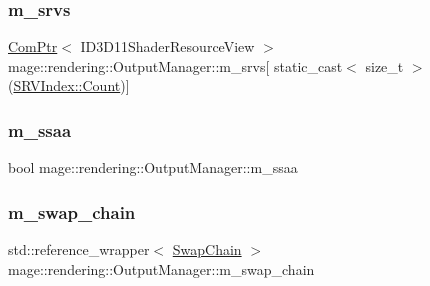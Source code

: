 \hypertarget{classmage_1_1rendering_1_1_output_manager_ac002667bd25dd978d6ff0ece782c8455}{}\label{classmage_1_1rendering_1_1_output_manager_ac002667bd25dd978d6ff0ece782c8455} 
\subsubsection{\texorpdfstring{m\+\_\+srvs}{m\_srvs}}
{\footnotesize\ttfamily \hyperlink{namespacemage_ae74f374780900893caa5555d1031fd79}{Com\+Ptr}$<$ I\+D3\+D11\+Shader\+Resource\+View $>$ mage\+::rendering\+::\+Output\+Manager\+::m\+\_\+srvs\mbox{[} static\+\_\+cast$<$ size\+\_\+t $>$(\hyperlink{classmage_1_1rendering_1_1_output_manager_a941f1b35a83ee0ce190494523ec0fe63ae93f994f01c537c4e2f7d8528c3eb5e9}{S\+R\+V\+Index\+::\+Count})\mbox{]}\hspace{0.3cm}{\ttfamily [private]}}

\hypertarget{classmage_1_1rendering_1_1_output_manager_ae0016fada4d4550d58481d2c313ea524}{}\label{classmage_1_1rendering_1_1_output_manager_ae0016fada4d4550d58481d2c313ea524} 
\subsubsection{\texorpdfstring{m\+\_\+ssaa}{m\_ssaa}}
{\footnotesize\ttfamily bool mage\+::rendering\+::\+Output\+Manager\+::m\+\_\+ssaa\hspace{0.3cm}{\ttfamily [private]}}

\hypertarget{classmage_1_1rendering_1_1_output_manager_ac9cffc724a38ffd3d9b49475fd29d3ba}{}\label{classmage_1_1rendering_1_1_output_manager_ac9cffc724a38ffd3d9b49475fd29d3ba} 
\subsubsection{\texorpdfstring{m\+\_\+swap\+\_\+chain}{m\_swap\_chain}}
{\footnotesize\ttfamily std\+::reference\+\_\+wrapper$<$ \hyperlink{classmage_1_1rendering_1_1_swap_chain}{Swap\+Chain} $>$ mage\+::rendering\+::\+Output\+Manager\+::m\+\_\+swap\+\_\+chain\hspace{0.3cm}{\ttfamily [private]}}

